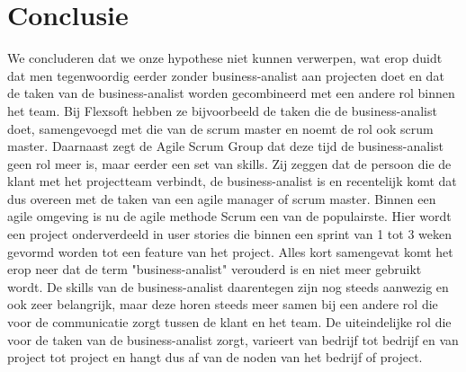 \documentclass{hogent-article}
\begin{document}
\section{Conclusie}
We concluderen dat we onze hypothese niet kunnen verwerpen, wat erop duidt dat men tegenwoordig eerder zonder business-analist aan projecten doet en dat de taken van de business-analist worden gecombineerd met een andere rol binnen het team.\newline \newline
Bij Flexsoft hebben ze bijvoorbeeld de taken die de business-analist doet, samengevoegd met die van de scrum master en noemt de rol ook scrum master. \newline
Daarnaast zegt de Agile Scrum Group dat deze tijd de business-analist geen rol meer is, maar eerder een set van skills. Zij zeggen dat de persoon die de klant met het projectteam verbindt, de business-analist is en recentelijk komt dat dus overeen met de taken van een agile manager of scrum master. \newline \newline
Binnen een agile omgeving is nu de agile methode Scrum een van de populairste. Hier wordt een project onderverdeeld in user stories die binnen een sprint van 1 tot 3 weken gevormd worden tot een feature van het project. \newline \newline
Alles kort samengevat komt het erop neer dat de term "business-analist" verouderd is en niet meer gebruikt wordt. De skills van de business-analist daarentegen zijn nog steeds aanwezig en ook zeer belangrijk, maar deze horen steeds meer samen bij een andere rol die voor de communicatie zorgt tussen de klant en het team. De uiteindelijke rol die voor de taken van de business-analist zorgt, varieert van bedrijf tot bedrijf en van project tot project en hangt dus af van de noden van het bedrijf of project.



\printbibliography
\end{document}
